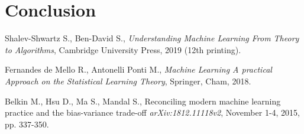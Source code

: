 \documentclass[a4paper]{article}
\begin{document}
\newpage

\section{Conclusion}

\newpage

\begin{thebibliography}{9}
	
	Shalev-Shwartz S., Ben-David S.,
	\textit{Understanding Machine Learning From Theory to Algorithms},
	Cambridge University Press, 2019 (12th printing).
	
	Fernandes de Mello R., Antonelli Ponti M.,
	\textit{Machine Learning A practical Approach on the Statistical Learning Theory},
	Springer, Cham, 2018.
	
	Belkin M., Hsu D., Ma S., Mandal S.,
	Reconciling modern machine learning practice and the bias-variance trade-off
	\textit{arXiv:1812.11118v2}, November 1-4, 2015, pp. 337-350. 
	
	
\end{thebibliography}
\newpage

\listoffigures
\newpage
\end{document}
